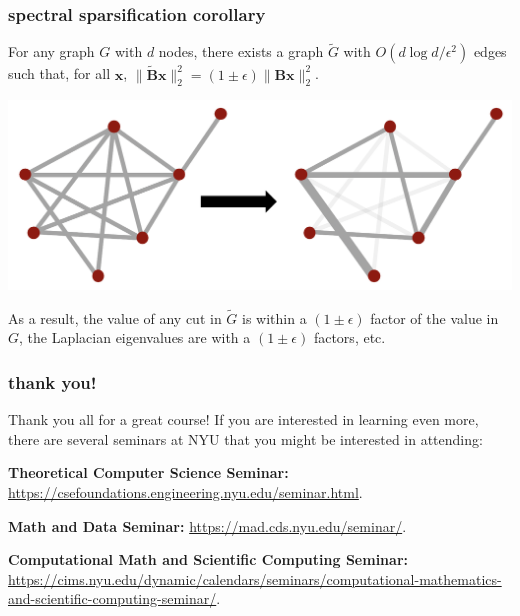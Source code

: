 \documentclass[compress]{beamer}
\newcommand{\bv}[1]{\mathbf{#1}}
\begin{document}
\begin{frame}[t]
	\frametitle{spectral sparsification corollary}
	For any graph $G$ with $d$ nodes, there exists a graph $\tilde{G}$ with $O(d\log d/\epsilon^2)$ edges such that, for all $\bv{x}$, $\|\tilde{\bv{B}}\bv{x}\|_2^2 = (1\pm\epsilon)\|{\bv{B}}\bv{x}\|_2^2$. 
	\begin{center}
		\includegraphics[width=.6\textwidth]{sparsifier.png}
	\end{center}
As a result, the value of any cut in $\tilde{G}$ is within a $(1\pm \epsilon)$ factor of the value in $G$, the Laplacian eigenvalues are with a $(1\pm \epsilon)$ factors, etc. 
\end{frame}

\begin{frame}[t]
	\frametitle{thank you!}
	Thank you all for a great course! If you are interested in learning even more, there are several seminars at NYU that you might be interested in attending:

	\textbf{Theoretical Computer Science Seminar:} \color{blue} \href{https://csefoundations.engineering.nyu.edu/seminar.html}{https://csefoundations.engineering.nyu.edu/seminar.html}.  \color{black}

	\textbf{Math and Data Seminar:} \color{blue} \href{https://mad.cds.nyu.edu/seminar/}{https://mad.cds.nyu.edu/seminar/}. \color{black}

	\textbf{Computational Math and Scientific Computing Seminar:} \color{blue} \href{https://cims.nyu.edu/dynamic/calendars/seminars/computational-mathematics-and-scientific-computing-seminar/}{https://cims.nyu.edu/dynamic/calendars/seminars/computational-mathematics-and-scientific-computing-seminar/}. \color{black}

\end{frame}
	
\end{document}
